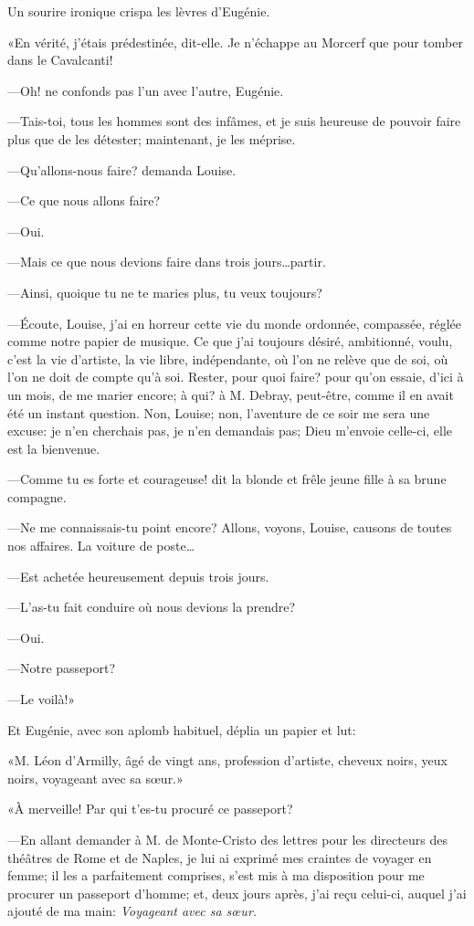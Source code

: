 Un sourire ironique crispa les lèvres d'Eugénie. 

«En vérité, j'étais prédestinée, dit-elle. Je n'échappe au Morcerf que pour tomber dans le Cavalcanti! 

—Oh! ne confonds pas l'un avec l'autre, Eugénie. 

—Tais-toi, tous les hommes sont des infâmes, et je suis heureuse de pouvoir faire plus que de les détester; maintenant, je les méprise. 

—Qu'allons-nous faire? demanda Louise. 

—Ce que nous allons faire? 

—Oui. 

—Mais ce que nous devions faire dans trois jours\dots partir. 

—Ainsi, quoique tu ne te maries plus, tu veux toujours? 

—Écoute, Louise, j'ai en horreur cette vie du monde ordonnée, compassée, réglée comme notre papier de musique. Ce que j'ai toujours désiré, ambitionné, voulu, c'est la vie d'artiste, la vie libre, indépendante, où l'on ne relève que de soi, où l'on ne doit de compte qu'à soi. Rester, pour quoi faire? pour qu'on essaie, d'ici à un mois, de me marier encore; à qui? à M. Debray, peut-être, comme il en avait été un instant question. Non, Louise; non, l'aventure de ce soir me sera une excuse: je n'en cherchais pas, je n'en demandais pas; Dieu m'envoie celle-ci, elle est la bienvenue. 

—Comme tu es forte et courageuse! dit la blonde et frêle jeune fille à sa brune compagne. 

—Ne me connaissais-tu point encore? Allons, voyons, Louise, causons de toutes nos affaires. La voiture de poste\dots 

—Est achetée heureusement depuis trois jours. 

—L'as-tu fait conduire où nous devions la prendre? 

—Oui. 

—Notre passeport? 

—Le voilà!» 

Et Eugénie, avec son aplomb habituel, déplia un papier et lut: 

«M. Léon d'Armilly, âgé de vingt ans, profession d'artiste, cheveux noirs, yeux noirs, voyageant avec sa sœur.» 

«À merveille! Par qui t'es-tu procuré ce passeport? 

—En allant demander à M. de Monte-Cristo des lettres pour les directeurs des théâtres de Rome et de Naples, je lui ai exprimé mes craintes de voyager en femme; il les a parfaitement comprises, s'est mis à ma disposition pour me procurer un passeport d'homme; et, deux jours après, j'ai reçu celui-ci, auquel j'ai ajouté de ma main: \textit{Voyageant avec sa sœur.} 

